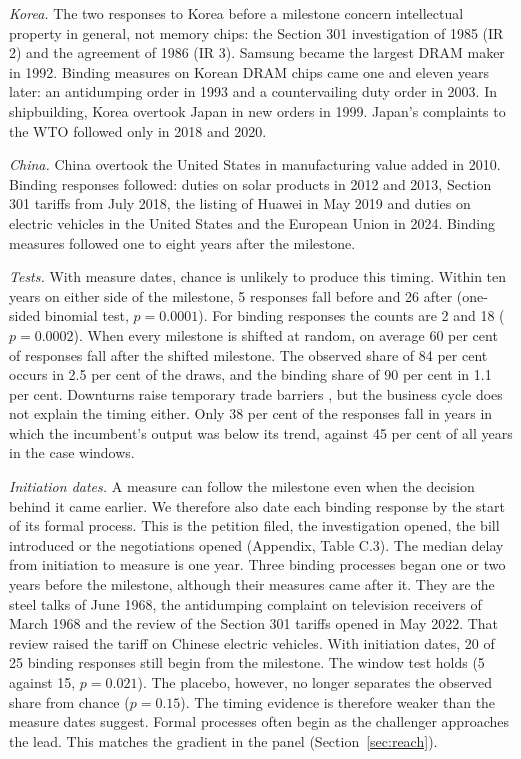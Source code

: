 \documentclass[review,authoryear,12pt]{elsarticle}
\begin{document}
\emph{Korea.} The two responses to Korea before a milestone concern intellectual property in general, not memory chips: the Section 301 investigation of 1985 (IR 2) and the agreement of 1986 (IR 3). Samsung became the largest DRAM maker in 1992. Binding measures on Korean DRAM chips came one and eleven years later: an antidumping order in 1993 and a countervailing duty order in 2003. In shipbuilding, Korea overtook Japan in new orders in 1999. Japan's complaints to the WTO followed only in 2018 and 2020.

\emph{China.} China overtook the United States in manufacturing value added in 2010. Binding responses followed: duties on solar products in 2012 and 2013, Section 301 tariffs from July 2018, the listing of Huawei in May 2019 and duties on electric vehicles in the United States and the European Union in 2024. Binding measures followed one to eight years after the milestone.

\emph{Tests.} With measure dates, chance is unlikely to produce this timing. Within ten years on either side of the milestone, 5 responses fall before and 26 after (one-sided binomial test, $p=0.0001$). For binding responses the counts are 2 and 18 ($p=0.0002$). When every milestone is shifted at random, on average 60 per cent of responses fall after the shifted milestone. The observed share of 84 per cent occurs in 2.5 per cent of the draws, and the binding share of 90 per cent in 1.1 per cent. Downturns raise temporary trade barriers \citep{bown2013jie}, but the business cycle does not explain the timing either. Only 38 per cent of the responses fall in years in which the incumbent's output was below its trend, against 45 per cent of all years in the case windows. 

\emph{Initiation dates.} A measure can follow the milestone even when the decision behind it came earlier. We therefore also date each binding response by the start of its formal process. This is the petition filed, the investigation opened, the bill introduced or the negotiations opened (Appendix, Table C.3). The median delay from initiation to measure is one year. Three binding processes began one or two years before the milestone, although their measures came after it. They are the steel talks of June 1968, the antidumping complaint on television receivers of March 1968 and the review of the Section 301 tariffs opened in May 2022. That review raised the tariff on Chinese electric vehicles. With initiation dates, 20 of 25 binding responses still begin from the milestone. The window test holds (5 against 15, $p=0.021$). The placebo, however, no longer separates the observed share from chance ($p=0.15$). The timing evidence is therefore weaker than the measure dates suggest. Formal processes often begin as the challenger approaches the lead. This matches the gradient in the panel (Section~\ref{sec:reach}).
\end{document}

